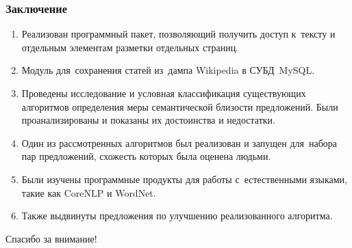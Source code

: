 \documentclass{beamer}
\begin{document}
\begin{frame}
\frametitle{Заключение}

\begin{enumerate}
\item {
Реализован программный пакет, позволяющий получить доступ к~тексту
и отдельным элементам разметки отдельных страниц.
}
\item {
Модуль для~сохранения статей из~дампа Wikipedia
в СУБД~MySQL.
}
\item {
Проведены исследование и условная классификация существующих 
алгоритмов определения меры семантической близости предложений. 
Были проанализированы и показаны их достоинства и недостатки.
}
\item {
Один из рассмотренных алгоритмов был реализован и запущен для~набора 
пар предложений, схожесть которых была оценена людьми. 
}
\item {
Были изучены программные продукты для работы
с~естественными языками, такие как CoreNLP и WordNet.
} 
\item {
Также выдвинуты предложения по улучшению реализованного алгоритма.
}
\end{enumerate}
\end{frame}

\begin{frame}
{\Large Спасибо за внимание!}
\end{frame}
\end{document}
